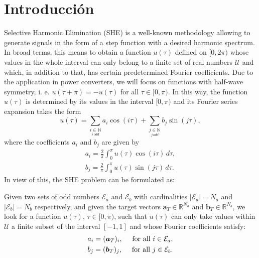 
\section{Introducción} 
 

Selective Harmonic Elimination (SHE) \cite{Rodriguez2002} is a well-known methodology allowing to generate signals in the form of a step function with a desired harmonic spectrum. 
%
In broad terms, this means to obtain a function $u(\tau)$ defined on $[0,2\pi)$ whose values in the whole interval can only belong to a finite set of real numbers $\mathcal{U}$ and which, in addition to that, has certain predetermined Fourier coefficients. 
%
Due to the application in power converters, we will focus on functions with half-wave symmetry, i. e. $u(\tau + \pi) = -u(\tau)$ for all $\tau \in [0,\pi)$. In this way, the function $u(\tau)$ is determined by its values in the interval $[0,\pi)$ and its Fourier series expansion takes the form
\begin{equation}
    u(\tau ) = \sum_{\underset{i\, odd}{i \in \mathbb{N}}} a_i \cos(i\tau)+ \sum_{\underset{j\, odd}{j \in \mathbb{N}}}  b_j \sin(j \tau), 
\end{equation}
where the coefficients $a_i$ and $b_j$ are given by
\begin{equation} \label{an}
    \begin{aligned}
    a_i = \frac{2}{\pi} \int_0^\pi u(\tau ) \cos(i \tau)\,d\tau, 
    \\
    b_j = \frac{2}{\pi} \int_0^\pi u(\tau)  \sin(j \tau)\,d\tau.
    \end{aligned}
\end{equation}
In view of this, the SHE problem can be formulated as:
\newline
\begin{problem}[SHE]\label{SHEp}
Given two sets of odd numbers $\mathcal{E} _a $ and $\mathcal{E} _b $ with cardinalities $|\mathcal{E}_a| = N_a $ and $ |\mathcal{E} _b| = N_b$ respectively, and given the target vectors $\bm{a}_T \in \mathbb{R}^{N_a}$ and $\bm{b}_T \in \mathbb{R}^{N_b} $, we look for a function $u(\tau)$, $\tau \in [0,\pi)$, such that $u(\tau) $ can only take values within $\mathcal{U}$ a finite subset of the interval $[-1,1]$ and whose Fourier coefficients satisfy: 
\begin{gather}
	\notag a_i = (\bm{a}_T)_i, \quad\textrm{ for all } i \in \mathcal{E}_a,
	\\
	\notag b_j = (\bm {b}_T)_j, \quad\textrm{ for all } j \in \mathcal{E}_b.
\end{gather}
\end{problem}

